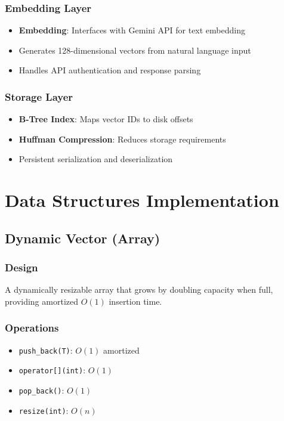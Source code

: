 \documentclass[12pt,a4paper]{article}
\begin{document}
\subsubsection{Embedding Layer}
\begin{itemize}
    \item \textbf{Embedding}: Interfaces with Gemini API for text embedding
    \item Generates 128-dimensional vectors from natural language input
    \item Handles API authentication and response parsing
\end{itemize}

\subsubsection{Storage Layer}
\begin{itemize}
    \item \textbf{B-Tree Index}: Maps vector IDs to disk offsets
    \item \textbf{Huffman Compression}: Reduces storage requirements
    \item Persistent serialization and deserialization
\end{itemize}

\section{Data Structures Implementation}

\subsection{Dynamic Vector (Array)}

\subsubsection{Design}
A dynamically resizable array that grows by doubling capacity when full, providing amortized $O(1)$ insertion time.

\subsubsection{Operations}
\begin{itemize}
    \item \texttt{push\_back(T)}: $O(1)$ amortized
    \item \texttt{operator[](int)}: $O(1)$
    \item \texttt{pop\_back()}: $O(1)$
    \item \texttt{resize(int)}: $O(n)$
\end{itemize}
\end{document}
